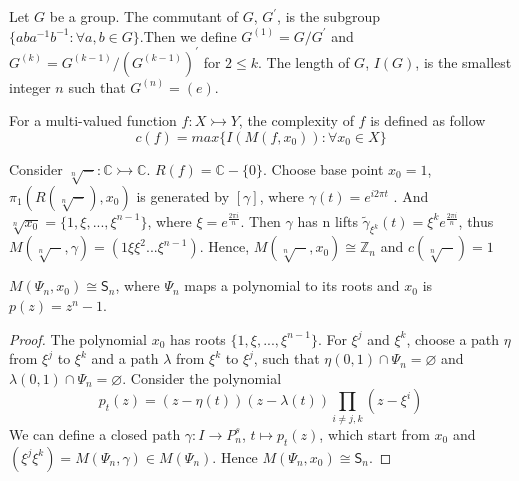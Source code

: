 \documentclass[12pt]{article}
\newcommand{\C}{\mathbb{C}}
\newenvironment{definition}[2][Definition]{\begin{trivlist}
\item[\hskip \labelsep {\bfseries #1}\hskip \labelsep {\bfseries #2.}]}{\end{trivlist}}
\newenvironment{example}[2][Example]{\begin{trivlist}
\item[\hskip \labelsep {\bfseries #1}\hskip \labelsep {\bfseries #2.}]}{\end{trivlist}}
\begin{document}
\begin{definition}{3.4}
    Let $G$ be a group. The commutant of $G$, $G^{'}$, is the subgroup $\{aba^{-1}b^{-1}:\forall a,b\in G\}$.Then we define $G^{(1)}=G/G^{'}$ and $G^{(k)}=G^{(k-1)}/(G^{(k-1)})^{'}$ for $2\leq k $. The length of $G$, $I(G)$, is the smallest integer $n$ such that $G^{(n)}=(e)$.
\end{definition}
\begin{definition}{3.5}
    For a multi-valued function $f:X\rightarrowtail Y$, the complexity of $f$ is defined as follow
    $$
    c(f)=max\{I(M(f,x_0)):\forall x_0\in X\}
    $$
\end{definition} 
\begin{example}{3.6}
    Consider $\sqrt[n]{-}:\C \rightarrowtail \C$. $R(f)=\C-\{0\}$. Choose base point $x_0=1$, $\pi_1(R(\sqrt[n]{-}),x_0)$ is generated by $[\gamma]$, where $\gamma(t)=e^{i2\pi t}$ . And $\sqrt[n]{x_0}= \{1,\xi,...,\xi^{n-1}\}$, where $\xi=e^{\frac{2\pi i}{n}}$. Then $\gamma$ has n lifts $\tilde{\gamma}_{\xi^k}(t)=\xi^ke^{\frac{2\pi i}{n}}$, thus $M(\sqrt[n]{-},\gamma)=(1\xi \xi^2...\xi^{n-1})$. Hence, $M(\sqrt[n]{-},x_0)\cong \mathbb{Z}_n$ and $c(\sqrt[n]{-})=1$
\end{example}
\begin{example}{3.7}
    $M(\Psi_n,x_0)\cong\mathsf{S}_n$, where $\Psi_n$ maps a polynomial to its roots and $x_0$ is $p(z)=z^n-1$.
\end{example}
\begin{proof}
    The polynomial $x_0$ has roots $\{1,\xi,...,\xi^{n-1}\}$. For $\xi^j$ and $\xi^k$, choose a path $\eta$ from $\xi^j$ to $\xi^k$ and a path $\lambda$ from $\xi^k$ to $\xi^j$, such that $\eta(0,1)\cap \Psi_n=\varnothing$ and $\lambda(0,1)\cap \Psi_n = \varnothing$. Consider the polynomial
    $$
    p_t(z)=(z-\eta(t))(z-\lambda(t))\prod_{i\neq j,k}(z-\xi^i)
    $$
    We can define a closed path $\gamma:I\to P_n^s$, $t\mapsto p_t(z)$, which start from $x_0$ and $(\xi^j \xi^k)=M(\Psi_n,\gamma)\in M(\Psi_n)$. Hence $M(\Psi_n,x_0)\cong\mathsf{S}_n$.
\end{proof}
\end{document}

